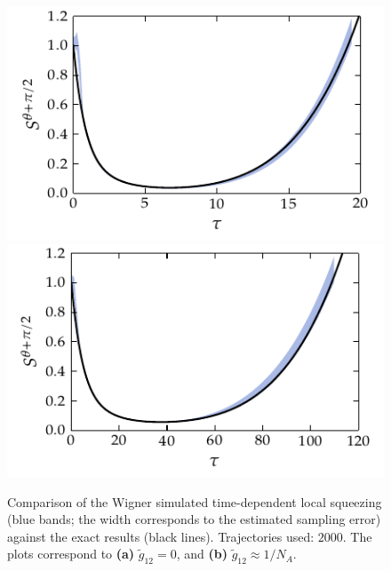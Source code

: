 \begin{figure}
    \centerline{%
    \includegraphics{figures_generated/exact/squeezing_nocc_100.pdf}%
    \includegraphics{figures_generated/exact/squeezing_cc_100.pdf}}

    \caption{
    Comparison of the Wigner simulated time-dependent local squeezing (blue bands; the width corresponds to the estimated sampling error) against the exact results (black lines).
    Trajectories used: $2000$.
    The plots correspond to \textbf{(a)} $\tilde{g}_{12} = 0$, and \textbf{(b)} $\tilde{g}_{12} \approx 1 / N_A$.}

    \label{fig:wigner-bec:mm:squeezing-comparison}
\end{figure}


